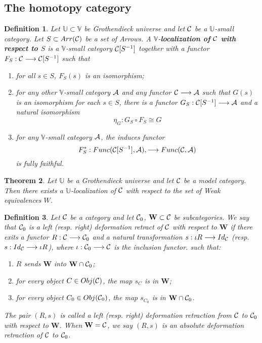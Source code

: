 \documentclass[11pt]{article}
\newtheorem{thm}{Theorem}[section]
\newtheorem{dfn}[thm]{Definition}
\newcommand{\cala}{{\cal A}}
\newcommand{\calc}{{\cal C}}
\newcommand{\lrta}{\longrightarrow}
\begin{document}
\subsection{The homotopy category}

\begin{dfn}
Let $\mathbb{U}\subset\mathbb{V}$ be Grothendieck universe and let $\calc$ be a $\mathbb{U}$-small category. Let $S\subset Arr(\calc)$ be a set of Arrows. A $\mathbb{V}$-\textbf{localization of $\calc$ with respect to $S$} is a $\mathbb{V}$-small category $\calc[S^{-1}]$ together with a functor $F_S:\calc\lrta \calc[S^{-1}]$ such that 
\begin{enumerate}[label=(\roman*)]
\item for all $s\in S$, $F_S(s)$ is an isomorphism;
\item for any other $\mathbb{V}$-small category $\cala$ and any functor $\calc\lrta \cala$ such that $G(s)$ is an isomorphism for each $s\in S$, there is a functor $G_S:\calc[S^{-1}]\lrta \cala$ and a natural isomorphism
$$
\eta_G: G_S\circ F_S\cong G
$$
\item for any $\mathbb{V}$-small category $\cala$, the induces functor
$$
F_S^*: Func(\calc[S^{-1}], \cala), \lrta Func(\calc,\cala)
$$
is fully faithful.
\end{enumerate}
\end{dfn}

\begin{thm}
Let $\mathbb{U}$ be a Grothendieck universe and let $\calc$ be a model category. Then there exists a $\mathbb{U}$-localization of $\calc$ with respect to the set of Weak equivalences $W$.
\end{thm}

\begin{dfn}
Let $\calc$ be a category and let $\calc_0$, $\mathbf{W}\subset \calc$ be subcategories. We say that $\calc_0$ is a left (resp. right) deformation retract of $\calc$ with respect to $\mathbf{W}$ if there exits a functor $R:\calc\lrta \calc_0$ and a natural transformation $s: \iota R\lrta Id_\calc$ (resp. $s: Id_\calc\lrta \iota R$), where $\iota:\calc_0\lrta \calc$ is the inclusion functor. such that:\begin{enumerate}
\item $R$ sends $\mathbf{W}$ into $\mathbf{W}\cap \calc_0$;
\item for every object $C\in Obj(\calc)$, the map $s_C$ is in $\mathbf{W}$;
\item for every object $C_0\in Obj(\calc_0)$, the map $s_{C_0}$ is in $\mathbf{W}\cap \calc_0$.
\end{enumerate}
The pair $(R,s)$ is called a left (resp. right) deformation retraction from $\calc$ to $\calc_0$ with respect to $\mathbf{W}$. When $\mathbf{W}=\calc$, we say  $(R,s)$ is an absolute deformation retraction of $\calc$ to $\calc_0$.
\end{dfn}
\end{document}
